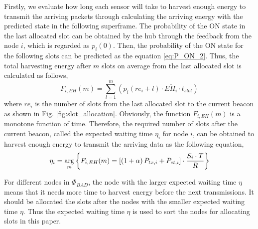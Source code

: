 \documentclass[journal,10pt]{IEEEtran}
\begin{document}
Firstly, we evaluate how long each sensor will take to harvest enough energy to transmit the arriving packets through calculating the arriving energy with the predicted state in the following superframe. The probability of the ON state in the last allocated slot can be obtained by the hub through the feedback from the node $i$, which is regarded as $p_{i}(0)$. Then, the probability of the ON state for the following slots can be predicted as the equation \eqref{eq:P_ON_2}. 
Thus, the total harvesting energy after $m$ slots on average from the last allocated slot is calculated as follows,
\begin{equation}  
F_{i,EH}(m) = {\sum\limits_{l = 1}^m {\left( {{p_i}\left( {r{e_i} + l} \right) \cdot \overline {E{H_i}}  \cdot {t_{slot}}} \right)} }
\end{equation}
where $re_{i}$ is the number of slots from the last allocated slot to the current beacon as shown in Fig. \ref{fig:slot_allocation}. Obviously, the function $F_{i,EH}(m)$ is a monotone function of time. 
Therefore, the required number of slots after the current beacon, called the expected waiting time $\eta_{i}$ for node $i$, can be obtained to harvest enough energy to transmit the arriving data as the following equation,
\begin{equation} \small
\eta_{i} = \mathop {\arg }\limits_m \left\{ { F_{i,EH}(m)   = \left[ {\left( {1 + \alpha } \right){P_{tx,i}} + {P_{ct,i}}} \right] \cdot {{{S_i} \cdot T} \over R}} \right\}
\end{equation}

For different nodes in ${\Phi _{BAD}}$, the node with the larger expected waiting time $\eta$ means that it needs more time to harvest energy before the next transmissions. It should be allocated the slots after the nodes with the smaller expected waiting time $\eta$.
Thus the expected waiting time $\eta$ is used to sort the nodes for allocating slots in this paper.
\end{document}
